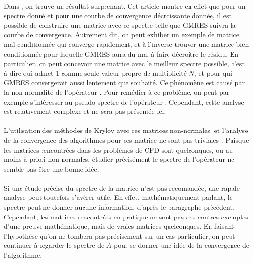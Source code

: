 		\paragraph{}
		Dans \cite{GreenbaumPtakStrakos1996}, on trouve un résultat surprenant.
		Cet article montre en effet que pour un spectre donné et pour une courbe de convergence décroissante donnée, il est possible de construire une matrice avec ce spectre telle que GMRES suivra la courbe de convergence.
		Autrement dit, on peut exhiber un exemple de matrice mal conditionnée qui converge rapidement, et à l'inverse trouver une matrice bien conditionnée pour laquelle GMRES aura du mal à faire décroitre le résidu.
		En particulier, on peut concevoir une matrice avec le meilleur spectre possible, c'est à dire qui admet 1 comme seule valeur propre de multiplicité $N$, et pour qui GMRES convergerait aussi lentement que souhaité.
		Ce phénomène est causé par la non-normalité de l'opérateur \cite{GreenbaumStrakos1994, GreenbaumPtakStrakos1996}.
		Pour remédier à ce problème, on peut par exemple s'intéresser au pseudo-spectre de l'opérateur \cite{Trefethen1999}.
		Cependant, cette analyse est relativement complexe et ne sera pas présentée ici.

		\paragraph{}
		L'utilisation des méthodes de Krylov avec ces matrices non-normales, et l'analyse de la convergence des algorithmes pour ces matrice ne sont pas triviales \cite{LiesenTichy2004, Huhtanen2005}.
		Puisque les matrices rencontrées dans les problèmes de CFD sont quelconques, ou au moins à priori non-normales, étudier précisément le spectre de l'opérateur ne semble pas être une bonne idée.

		\paragraph{}
		Si une étude précise du spectre de la matrice n'est pas recomandée, une rapide analyse peut toutefois s'avérer utile.
		En effet, mathématiquement parlant, le spectre peut ne donner aucune information, d'après le paragraphe précédent.
		Cependant, les matrices rencontrées en pratique ne sont pas des contres-exemples d'une preuve mathématique, mais de vraies matrices quelconques.
		En faisant l'hypothèse qu'on ne tombera pas précisément sur un cas particulier, on peut continuer à regarder le spectre de $A$ pour se donner une idée de la convergence de l'algorithme.

